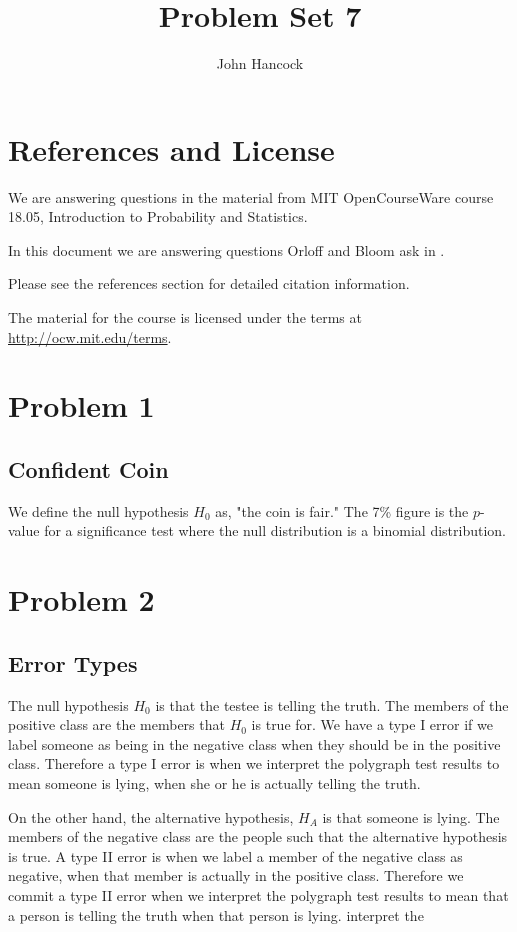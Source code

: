 \documentclass[a5paper,11pt]{article}
\author{John Hancock}
\title{Problem Set 7}
\begin{document}
\maketitle

\tableofcontents

\section{References and License}
We are answering questions in the material from MIT OpenCourseWare
course 18.05, Introduction to Probability and Statistics.

In this document we are answering questions Orloff and Bloom ask in
\cite{probSet7}.

Please see the references section for detailed citation information.

The material for the course is licensed under the terms at
\url{http://ocw.mit.edu/terms}.

\section{Problem 1}
\subsection{Confident Coin}
We define the null hypothesis $H_{0}$ as, "the coin is fair."  
The 7\% figure is the $p$-value for a significance test where the
null distribution is a binomial distribution.

\section{Problem 2}
\subsection{Error Types}
The null hypothesis $H_{0}$ is that the testee is telling the truth.  The 
members of the positive class are the members that $H_{0}$ is true for.
We have a type I error if we label someone as being in the negative class
when they should be in the positive class.  Therefore a type I error is when 
we interpret the polygraph test results to mean someone is lying, when she
or he is actually telling the truth.

On the other hand, the alternative hypothesis, $H_{A}$ is that someone is
lying.  The members of the negative class are the people such that the 
alternative hypothesis is true.  A type II error is when we label a member
of the negative class as negative, when that member is actually in the
positive class.  Therefore we commit a type II error when we interpret
the polygraph test results to mean that a person is telling the truth when
that person is lying.
interpret the 
\printbibliography{}
\end{document}
